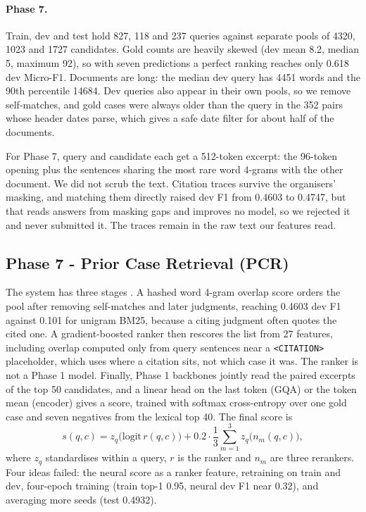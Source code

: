 
\paragraph{Phase 7.} Train, dev and test hold 827, 118 and 237 queries against separate pools of 4320, 1023 and 1727 candidates. Gold counts are heavily skewed (dev mean 8.2, median 5, maximum 92), so with seven predictions a perfect ranking reaches only 0.618 dev Micro-F1. Documents are long: the median dev query has 4451 words and the 90th percentile 14684. Dev queries also appear in their own pools, so we remove self-matches, and gold cases were always older than the query in the 352 pairs whose header dates parse, which gives a safe date filter for about half of the documents.

For Phase 7, query and candidate each get a 512-token excerpt: the 96-token opening plus the sentences sharing the most rare word 4-grams with the other document. We did not scrub the text. Citation traces survive the organisers' masking, and matching them directly raised dev F1 from 0.4603 to 0.4747, but that reads answers from masking gaps and improves no model, so we rejected it and never submitted it. The traces remain in the raw text our features read.

\subsection{Phase 7 - Prior Case Retrieval (PCR)}
The system has three stages \cite{nogueira2019passage}. A hashed word 4-gram overlap score orders the pool after removing self-matches and later judgments, reaching 0.4603 dev F1 against 0.101 for unigram BM25, because a citing judgment often quotes the cited one. A gradient-boosted ranker \cite{ke2017lightgbm} then rescores the list from 27 features, including overlap computed only from query sentences near a \texttt{<CITATION>} placeholder, which uses where a citation sits, not which case it was. The ranker is not a Phase 1 model. Finally, Phase 1 backbones jointly read the paired excerpts of the top 50 candidates, and a linear head on the last token (GQA) or the token mean (encoder) gives a score, trained with softmax cross-entropy over one gold case and seven negatives from the lexical top 40. The final score is
\begin{equation}
s(q,c) = z_q\big(\mathrm{logit}\,r(q,c)\big) + 0.2\cdot\frac{1}{3}\sum_{m=1}^{3} z_q\big(n_m(q,c)\big),
\end{equation}
where $z_q$ standardises within a query, $r$ is the ranker and $n_m$ are three rerankers. Four ideas failed: the neural score as a ranker feature, retraining on train and dev, four-epoch training (train top-1 0.95, neural dev F1 near 0.32), and averaging more seeds (test 0.4932).

